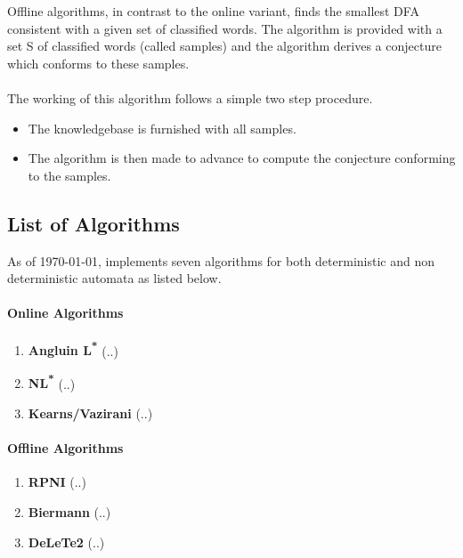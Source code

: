 Offline algorithms, in contrast to the online variant, finds the smallest DFA consistent with a given set of classified words.
The algorithm is provided with a set S of classified words (called samples) and the algorithm derives a conjecture which conforms to these samples. 

\paragraph{}
The working of this algorithm follows a simple two step procedure. 
\begin{itemize}
 \item The knowledgebase is furnished with all samples. 
 \item The algorithm is then made to advance to compute the conjecture conforming to the samples. 
\end{itemize}

\subsection*{List of Algorithms}

As of \today, \libalf implements seven algorithms for both deterministic and non deterministic automata as listed below.

\paragraph{Online Algorithms}

\begin{enumerate}
 \item \textbf{Angluin L\textsuperscript{*}} \cite{36889-angluin1} \cite{181015-angluin2} \cite{640230-angluin3}
	(..)
 \item \textbf{NL\textsuperscript{*}} \cite{DBLP:conf/ijcai/BolligHKL09-nl1} \cite{DBLP:conf/wia/GarciaRCA05-nl2}
	(..)
 \item \textbf{Kearns/Vazirani} \cite{DBLP:conf/nips/CrammerKW06-Kearns1} \cite{DBLP:conf/nips/LittmanKS01-kearns2} \cite{200548-kearns3}
	(..)
\end{enumerate}

\paragraph{Offline Algorithms}

\begin{enumerate}
 \item \textbf{RPNI} \cite{DBLP:conf/aia/Hoffmann07-rpni1} \cite{599647-rpni2} \cite{655948-rpni3} \cite{1434324-rpni4}
	(..)
 \item \textbf{Biermann} \cite{17952-biermann1}
	(..)
 \item \textbf{DeLeTe2} \cite{982366-delete1}
	(..)
\end{enumerate}

